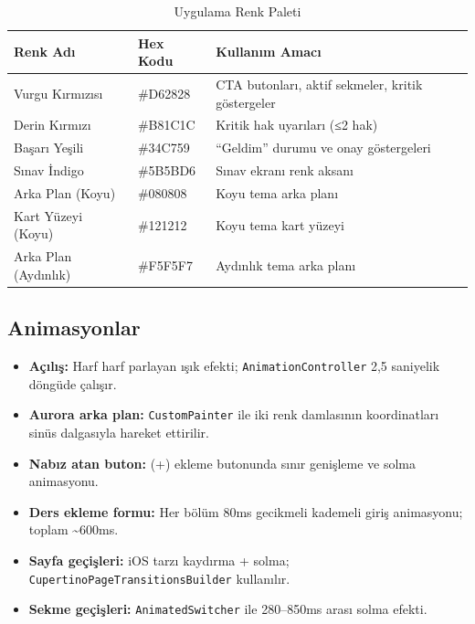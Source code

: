 \documentclass[12pt,a4paper]{article}
\begin{document}
\begin{table}[H]
    \centering
    \caption{Uygulama Renk Paleti}
    \label{tab:renkler}
    \renewcommand{\arraystretch}{1.3}
    \begin{tabularx}{\textwidth}{l >{\ttfamily}l X}
        \toprule
        \textbf{Renk Adı} & \normalfont\textbf{Hex Kodu} & \textbf{Kullanım Amacı} \\
        \midrule
        Vurgu Kırmızısı & \#D62828 & CTA butonları, aktif sekmeler, kritik göstergeler \\
        Derin Kırmızı   & \#B81C1C & Kritik hak uyarıları (≤2 hak) \\
        Başarı Yeşili   & \#34C759 & ``Geldim'' durumu ve onay göstergeleri \\
        Sınav İndigo    & \#5B5BD6 & Sınav ekranı renk aksanı \\
        Arka Plan (Koyu) & \#080808 & Koyu tema arka planı \\
        Kart Yüzeyi (Koyu) & \#121212 & Koyu tema kart yüzeyi \\
        Arka Plan (Aydınlık) & \#F5F5F7 & Aydınlık tema arka planı \\
        \bottomrule
    \end{tabularx}
\end{table}

\subsection{Animasyonlar}

\begin{itemize}
    \item \textbf{Açılış:} Harf harf parlayan ışık efekti; \texttt{AnimationController} 2,5 saniyelik döngüde çalışır.
    \item \textbf{Aurora arka plan:} \texttt{CustomPainter} ile iki renk damlasının koordinatları sinüs dalgasıyla hareket ettirilir.
    \item \textbf{Nabız atan buton:} (+) ekleme butonunda sınır genişleme ve solma animasyonu.
    \item \textbf{Ders ekleme formu:} Her bölüm 80ms gecikmeli kademeli giriş animasyonu; toplam \textasciitilde{}600ms.
    \item \textbf{Sayfa geçişleri:} iOS tarzı kaydırma + solma; \texttt{CupertinoPageTransitionsBuilder} kullanılır.
    \item \textbf{Sekme geçişleri:} \texttt{AnimatedSwitcher} ile 280--850ms arası solma efekti.
\end{itemize}
\end{document}
